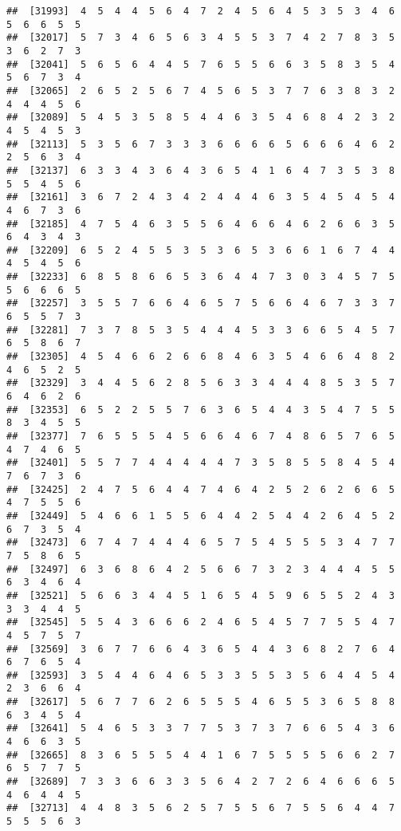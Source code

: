 \documentclass[
]{book}
\begin{document}
\begin{verbatim}
##  [31993]  4  5  4  4  5  6  4  7  2  4  5  6  4  5  3  5  3  4  6  5  6  6  5  5
##  [32017]  5  7  3  4  6  5  6  3  4  5  5  3  7  4  2  7  8  3  5  3  6  2  7  3
##  [32041]  5  6  5  6  4  4  5  7  6  5  5  6  6  3  5  8  3  5  4  5  6  7  3  4
##  [32065]  2  6  5  2  5  6  7  4  5  6  5  3  7  7  6  3  8  3  2  4  4  4  5  6
##  [32089]  5  4  5  3  5  8  5  4  4  6  3  5  4  6  8  4  2  3  2  4  5  4  5  3
##  [32113]  5  3  5  6  7  3  3  3  6  6  6  6  5  6  6  6  4  6  2  2  5  6  3  4
##  [32137]  6  3  3  4  3  6  4  3  6  5  4  1  6  4  7  3  5  3  8  5  5  4  5  6
##  [32161]  3  6  7  2  4  3  4  2  4  4  4  6  3  5  4  5  4  5  4  4  6  7  3  6
##  [32185]  4  7  5  4  6  3  5  5  6  4  6  6  4  6  2  6  6  3  5  6  4  3  4  3
##  [32209]  6  5  2  4  5  5  3  5  3  6  5  3  6  6  1  6  7  4  4  4  5  4  5  6
##  [32233]  6  8  5  8  6  6  5  3  6  4  4  7  3  0  3  4  5  7  5  5  6  6  6  5
##  [32257]  3  5  5  7  6  6  4  6  5  7  5  6  6  4  6  7  3  3  7  6  5  5  7  3
##  [32281]  7  3  7  8  5  3  5  4  4  4  5  3  3  6  6  5  4  5  7  6  5  8  6  7
##  [32305]  4  5  4  6  6  2  6  6  8  4  6  3  5  4  6  6  4  8  2  4  6  5  2  5
##  [32329]  3  4  4  5  6  2  8  5  6  3  3  4  4  4  8  5  3  5  7  6  4  6  2  6
##  [32353]  6  5  2  2  5  5  7  6  3  6  5  4  4  3  5  4  7  5  5  8  3  4  5  5
##  [32377]  7  6  5  5  5  4  5  6  6  4  6  7  4  8  6  5  7  6  5  4  7  4  6  5
##  [32401]  5  5  7  7  4  4  4  4  4  7  3  5  8  5  5  8  4  5  4  7  6  7  3  6
##  [32425]  2  4  7  5  6  4  4  7  4  6  4  2  5  2  6  2  6  6  5  4  7  5  5  6
##  [32449]  5  4  6  6  1  5  5  6  4  4  2  5  4  4  2  6  4  5  2  6  7  3  5  4
##  [32473]  6  7  4  7  4  4  4  6  5  7  5  4  5  5  5  3  4  7  7  7  5  8  6  5
##  [32497]  6  3  6  8  6  4  2  5  6  6  7  3  2  3  4  4  4  5  5  6  3  4  6  4
##  [32521]  5  6  6  3  4  4  5  1  6  5  4  5  9  6  5  5  2  4  3  3  3  4  4  5
##  [32545]  5  5  4  3  6  6  6  2  4  6  5  4  5  7  7  5  5  4  7  4  5  7  5  7
##  [32569]  3  6  7  7  6  6  4  3  6  5  4  4  3  6  8  2  7  6  4  6  7  6  5  4
##  [32593]  3  5  4  4  6  4  6  5  3  3  5  5  3  5  6  4  4  5  4  2  3  6  6  4
##  [32617]  5  6  7  7  6  2  6  5  5  5  4  6  5  5  3  6  5  8  8  6  3  4  5  4
##  [32641]  5  4  6  5  3  3  7  7  5  3  7  3  7  6  6  5  4  3  6  4  6  6  3  5
##  [32665]  8  3  6  5  5  5  4  4  1  6  7  5  5  5  5  6  6  2  7  6  5  7  7  5
##  [32689]  7  3  3  6  6  3  3  5  6  4  2  7  2  6  4  6  6  6  5  4  6  4  4  5
##  [32713]  4  4  8  3  5  6  2  5  7  5  5  6  7  5  5  6  4  4  7  5  5  5  6  3

\end{verbatim}
\end{document}
